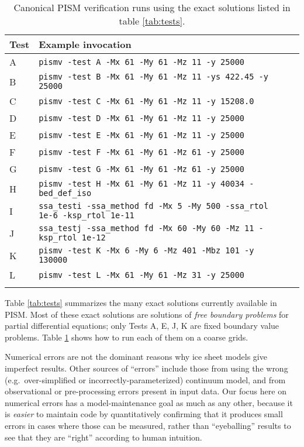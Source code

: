 \begin{table}[ht]
\centering
\caption{Canonical PISM  verification runs using the exact solutions listed in table \ref{tab:tests}.}\label{tab:tests-exec}
\small
\begin{tabular}{@{}llll}\toprule
\textbf{Test} & \textbf{Example invocation}  \\ \midrule
A & \texttt{pismv -test A -Mx 61 -My 61 -Mz 11 -y 25000} \\
B & \texttt{pismv -test B -Mx 61 -My 61 -Mz 11 -ys 422.45 -y 25000}  \\
C & \texttt{pismv -test C -Mx 61 -My 61 -Mz 11 -y 15208.0}  \\
D & \texttt{pismv -test D -Mx 61 -My 61 -Mz 11 -y 25000}  \\
E & \texttt{pismv -test E -Mx 61 -My 61 -Mz 11 -y 25000}  \\
F & \texttt{pismv -test F -Mx 61 -My 61 -Mz 61 -y 25000}  \\
G & \texttt{pismv -test G -Mx 61 -My 61 -Mz 61 -y 25000}  \\
H & \texttt{pismv -test H -Mx 61 -My 61 -Mz 11 -y 40034 -bed_def_iso} \\
I & \texttt{ssa_testi -ssa_method fd -Mx 5 -My 500 -ssa_rtol 1e-6 -ksp_rtol 1e-11 } \\
J & \texttt{ssa_testj -ssa_method fd -Mx 60 -My 60 -Mz 11 -ksp_rtol 1e-12} \\
K & \texttt{pismv -test K -Mx 6 -My 6 -Mz 401 -Mbz 101 -y 130000} \\
L & \texttt{pismv -test L -Mx 61 -My 61 -Mz 31 -y 25000} \\
\bottomrule
\normalsize
\end{tabular}
\end{table}

Table \ref{tab:tests} summarizes the many exact solutions currently available in PISM.  Most of these exact solutions are solutions of \emph{free boundary problems} for partial differential equations; only Tests A, E, J, K are fixed boundary value problems.  Table \ref{tab:tests-exec} shows how to run each of them on a coarse grids.

Numerical errors are not the dominant reasons why ice sheet models give imperfect results.  Other sources of ``errors'' include those from using the wrong (e.g.~over-simplified or incorrectly-parameterized) continuum model, and from observational or pre-processing errors present in input data.  Our focus here on numerical errors has a model-maintenance goal as much as any other, because it is \emph{easier} to maintain code by quantitatively confirming that it produces small errors in cases where those can be measured, rather than ``eyeballing'' results to see that they are ``right'' according to human intuition.


